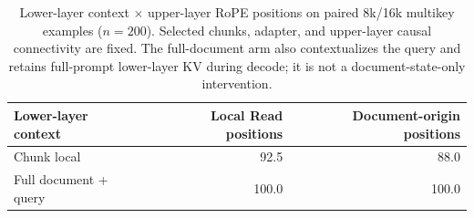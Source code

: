 \begin{table}[htbp]
\centering
\small
\setlength{\tabcolsep}{4pt}
\begin{tabular}{@{}lrr@{}}
\toprule
Lower-layer context & Local Read positions & Document-origin positions \\
\midrule
Chunk local & 92.5 & 88.0 \\
Full document + query & 100.0 & 100.0 \\
\bottomrule
\end{tabular}
\caption{Lower-layer context $\times$ upper-layer RoPE positions on paired 8k/16k multikey examples ($n=200$). Selected chunks, adapter, and upper-layer causal connectivity are fixed. The full-document arm also contextualizes the query and retains full-prompt lower-layer KV during decode; it is not a document-state-only intervention.}
\label{tab:context}
\end{table}

